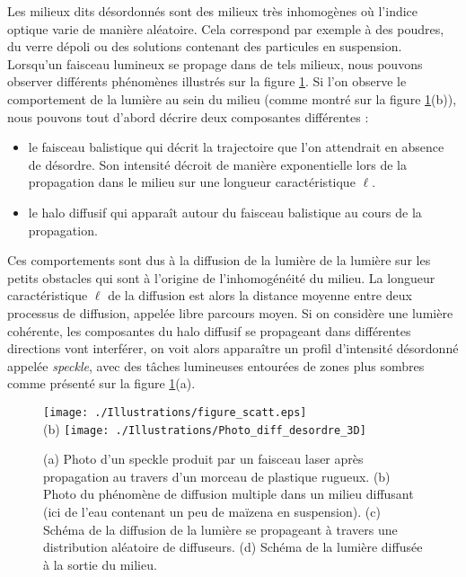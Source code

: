 \documentclass[a4paper,11pt]{article} %
\begin{document}
	Les milieux dits désordonnés sont des milieux très inhomogènes où l'indice optique varie de manière aléatoire. Cela correspond par exemple à des poudres, du verre dépoli ou des solutions contenant des particules en suspension. Lorsqu'un faisceau lumineux se propage dans de tels milieux, nous pouvons observer différents phénomènes illustrés sur la figure \ref{fig:diffusion_desordre_3D}. Si l'on observe le comportement de la lumière au sein du milieu (comme montré sur la figure \ref{fig:diffusion_desordre_3D}(b)), nous pouvons tout d'abord décrire deux  composantes différentes :
	\begin{itemize}
		\item le faisceau balistique qui décrit la trajectoire que l'on attendrait en absence de désordre. Son intensité décroit de manière exponentielle lors de la propagation dans le milieu sur une longueur caractéristique $\ell$.
		\item le halo diffusif qui apparaît autour du faisceau balistique au cours de la propagation.
	\end{itemize}
	Ces comportements sont dus à la diffusion de la lumière de la lumière sur les petits obstacles qui sont à l'origine de l'inhomogénéité du milieu. La longueur caractéristique $\ell$ de la diffusion est alors la distance moyenne entre deux processus de diffusion, appelée libre parcours moyen. Si on considère une lumière cohérente, les composantes du halo diffusif se propageant dans différentes directions vont interférer, on voit alors apparaître un profil d'intensité désordonné appelée \textit{speckle}, avec des tâches lumineuses entourées de zones plus sombres comme présenté sur la figure \ref{fig:diffusion_desordre_3D}(a).
	
	\begin{figure}[h]
		\centering
		\begin{minipage}[c]{0.85\linewidth}
			\centering
			\texttt{[image: ./Illustrations/figure\_scatt.eps]} \\
			(b) \hspace{0.1cm} \texttt{[image: ./Illustrations/Photo\_diff\_desordre\_3D]}
			\caption{(a) Photo d'un speckle produit par un faisceau laser après propagation au travers d'un morceau de plastique rugueux. (b) Photo du phénomène de diffusion multiple dans un milieu diffusant (ici de l'eau contenant un peu de maïzena en suspension). (c) Schéma de la diffusion de la lumière se propageant à travers une distribution aléatoire de diffuseurs. (d) Schéma de la lumière diffusée à la sortie du milieu.}
			\label{fig:diffusion_desordre_3D}
		\end{minipage}
	\end{figure}	
	
\end{document}

